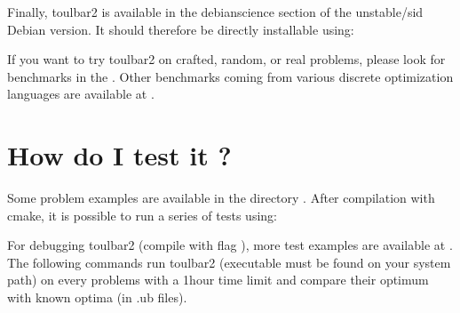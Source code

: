 \documentclass[letterpaper,10pt,openany,oneside,english]{sphinxmanual}
\begin{document}
\begin{sphinxVerbatim}[commandchars=\\\{\}]
  
 
 
 
 
\end{sphinxVerbatim}

\sphinxAtStartPar
Finally, toulbar2 is available in the debian\sphinxhyphen{}science section of the unstable/sid Debian version. It should therefore be directly installable using:

\begin{sphinxVerbatim}[commandchars=\\\{\}]
   
\end{sphinxVerbatim}

\sphinxAtStartPar
If you want to try toulbar2 on crafted, random, or real problems, please look for benchmarks in the . Other benchmarks coming from various discrete optimization languages are available at  .


\chapter{How do I test it ?}
\label{\detokenize{userdoc:how-do-i-test-it}}
\sphinxAtStartPar
Some problem examples are available in the directory . After compilation with cmake, it is possible to run a series of tests using:

\begin{sphinxVerbatim}[commandchars=\\\{\}]
 
\end{sphinxVerbatim}

\sphinxAtStartPar
For debugging toulbar2 (compile with flag ), more test examples are available at .
The following commands run toulbar2 (executable must be found on your system path) on every problems with a 1\sphinxhyphen{}hour time limit and compare their optimum with known optima (in .ub files).
\end{document}
